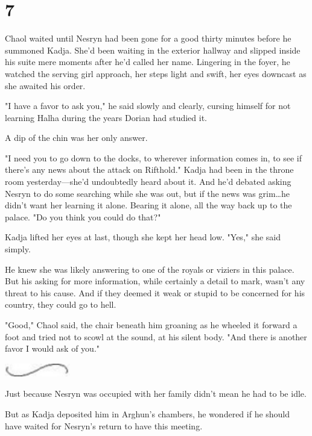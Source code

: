 
\chapter{7}

Chaol waited until Nesryn had been gone for a good thirty minutes before he summoned Kadja.
She'd been waiting in the exterior hallway and slipped inside his suite mere moments after he'd called her name.
Lingering in the foyer, he watched the serving girl approach, her steps light and swift, her eyes downcast as she awaited his order.

"I have a favor to ask you," he said slowly and clearly, cursing himself for not learning Halha during the years Dorian had studied it.

A dip of the chin was her only answer.

"I need you to go down to the docks, to wherever information comes in, to see if there's any news about the attack on Rifthold."
Kadja had been in the throne room yesterday---she'd undoubtedly heard about it.
And he'd debated asking Nesryn to do some searching while she was out, but if the news was grim\ldots he didn't want her learning it alone.
Bearing it alone, all the way back up to the palace.
"Do you think you could do that?"

Kadja lifted her eyes at last, though she kept her head low.
"Yes," she said simply.

He knew she was likely answering to one of the royals or viziers in this palace.
But his asking for more information, while certainly a detail to mark, wasn't any threat to his cause.
And if they deemed it weak or stupid to be concerned for his country, they could go to hell.

"Good," Chaol said, the chair beneath him groaning as he wheeled it forward a foot and tried not to scowl at the sound, at his silent body.
"And there is another favor I would ask of you."

\begin{center}
\includegraphics[width=1.12in,height=0.24in]{images/seperator}
\end{center}

Just because Nesryn was occupied with her family didn't mean he had to be idle.

But as Kadja deposited him in Arghun's chambers, he wondered if he should have waited for Nesryn's return to have this meeting.

